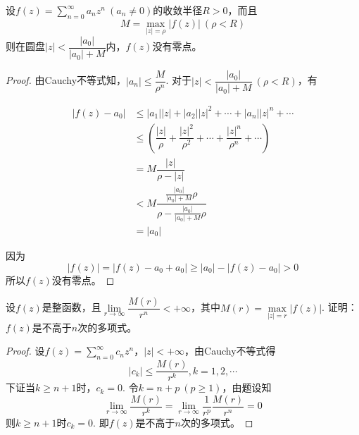 \begin{proposition}

    设$f(z) = \sum\limits_{n = 0}^{\infty}{a_n z^n} \ (a_n \neq 0)$的收敛半径$R > 0$，而且
    $$M = \max_{|z| = \rho}{|f(z)|}\ (\rho < R)$$
    则在圆盘$|z| < \dfrac{|a_0|}{|a_0| + M}$内，$f(z)$没有零点。

\end{proposition}

\begin{proof}

    由\textup{Cauchy}不等式知，$|a_n| \leq \dfrac{M}{\rho^n}$. 对于$|z| < \dfrac{|a_0|}{|a_0| + M}\ (\rho < R)$，有

    \begin{align*}
        |f(z) - a_0| & \leq |a_1||z| + |a_2||z|^2 + \cdots + |a_n||z|^n + \cdots \\
        & \leq \left( \dfrac{|z|}{\rho} + \dfrac{|z|^2}{\rho^2} + \cdots + \dfrac{|z|^n}{\rho^n} + \cdots \right) \\
        & = M \dfrac{|z|}{\rho - |z|} \\
        & < M \dfrac{\frac{|a_0|}{|a_0| + M}\rho}{\rho - \frac{|a_0|}{|a_0| + M}\rho} \\
        & = |a_0|
    \end{align*}

    因为
    $$|f(z)| = |f(z) - a_0 + a_0| \geq |a_0| - |f(z) - a_0| > 0$$
    所以$f(z)$没有零点。

\end{proof}

\begin{proposition}

    设$f(z)$是整函数，且$\lim\limits_{r \to \infty}{\dfrac{M(r)}{r^n}} < +\infty$，其中$M(r) = \max\limits_{|z| = r}{|f(z)|}$. 证明：$f(z)$是不高于$n$次的多项式。

\end{proposition}

\begin{proof}

    设$f(z) = \sum\limits_{n = 0}^{\infty}{c_n z^n}$，$|z| < + \infty$，由\textup{Cauchy}不等式得
    $$|c_k| \leq \dfrac{M(r)}{r^k}, k = 1, 2, \cdots$$
    下证当$k \geq n + 1$时，$c_k = 0$. 令$k = n + p \ (p \geq 1)$，由题设知
    $$\lim\limits_{r \to \infty}{\dfrac{M(r)}{r^k}} = \lim\limits_{r \to \infty}{\dfrac{1}{r^p} \dfrac{M(r)}{r^n}} = 0$$
    则$k \geq n + 1$时$c_k = 0$. 即$f(z)$是不高于$n$次的多项式。

\end{proof}

